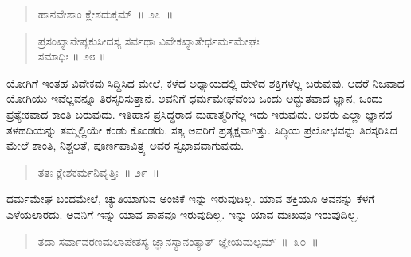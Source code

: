 \vspace{-0.3cm}

\begin{verse}
ಹಾನವೇಶಾಂ ಕ್ಲೇಶದುಕ್ತಮ್​~॥ ೨೭~॥
\end{verse}

\vspace{-0.35cm}


\vspace{0.08cm}

\begin{verse}
ಪ್ರಸಂಖ್ಯಾನೇಪ್ಯಕುಸೀದಸ್ಯ ಸರ್ವಥಾ ವಿವೇಕಖ್ಯಾತೇರ್ಧರ್ಮಮೇಘಃ \\
\hspace{6cm} ಸಮಾಧಿಃ ॥ ೨೮ ॥
\end{verse}

\vspace{-0.3cm}


\vspace{0.1cm}

ಯೋಗಿಗೆ ಇಂತಹ ವಿವೇಕವು ಸಿದ್ಧಿಸಿದ ಮೇಲೆ, ಕಳೆದ ಅಧ್ಯಾಯದಲ್ಲಿ ಹೇಳಿದ ಶಕ್ತಿಗಳೆಲ್ಲ ಬರುವುವು. ಆದರೆ ನಿಜವಾದ ಯೋಗಿಯು ಇವೆಲ್ಲವನ್ನೂ ತಿರಸ್ಕರಿಸುತ್ತಾನೆ. ಅವನಿಗೆ ಧರ್ಮಮೇಘವೆಂಬ ಒಂದು ಅದ್ಭುತವಾದ ಜ್ಞಾನ, ಒಂದು ಪ್ರತ್ಯೇಕವಾದ ಕಾಂತಿ ಬರುವುದು. ಇತಿಹಾಸ ಪ್ರಸಿದ್ಧರಾದ ಮಹಾತ್ಮರಿಗೆಲ್ಲ ಇದು ಇರುವುದು. ಅವರು ಎಲ್ಲಾ ಜ್ಞಾನದ ತಳಹದಿಯನ್ನು ತಮ್ಮಲ್ಲಿಯೇ ಕಂಡು ಕೊಂಡರು. ಸತ್ಯ ಅವರಿಗೆ ಪ್ರತ್ಯಕ್ಷವಾಗಿತ್ತು. ಸಿದ್ಧಿಯ ಪ್ರಲೋಭವನ್ನು ತಿರಸ್ಕರಿಸಿದ ಮೇಲೆ ಶಾಂತಿ, ನಿಶ್ಚಲತೆ, ಪೂರ್ಣಪಾವಿತ್ರ್ಯ ಅವರ ಸ್ವಭಾವವಾಗುವುದು. 

\vspace{-0.2cm}

\begin{verse}
ತತಃ ಕ್ಲೇಶಕರ್ಮನಿವೃತ್ತಿಃ~॥ ೨೯~॥
\end{verse}

\vspace{-0.3cm}


\vfill\eject	

ಧರ್ಮಮೇಘ ಬಂದಮೇಲೆ, ಚ್ಯುತಿಯಾಗುವ ಅಂಜಿಕೆ ಇನ್ನು ಇರುವುದಿಲ್ಲ. ಯಾವ ಶಕ್ತಿಯೂ ಅವನನ್ನು ಕೆಳಗೆ ಎಳೆಯಲಾರದು. ಅವನಿಗೆ ಇನ್ನು ಯಾವ ಪಾಪವೂ ಇರುವುದಿಲ್ಲ. ಇನ್ನು ಯಾವ ದುಃಖವೂ ಇರುವುದಿಲ್ಲ. 

\vspace{-0.2cm}

\begin{verse}
ತದಾ ಸರ್ವಾವರಣಮಲಾಪೇತಸ್ಯ ಜ್ಞಾನಸ್ಯಾನಂತ್ಯಾತ್​  ಜ್ಞೇಯಮಲ್ಪಮ್​~॥~೩೦~॥
\end{verse}

